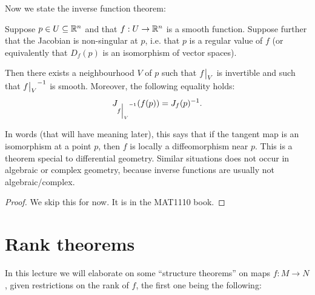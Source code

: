 \documentclass[11pt, english]{article}
\begin{document}
Now we state the inverse function theorem:
\begin{thm}
Suppose $p \in U \subseteq \mathbb{R}^n$ and that $f:U \to \mathbb{R}^n$ is a smooth function. Suppose further that the Jacobian is non-singular at $p$, i.e. that $p$ is a regular value of $f$ (or equivalently that $D_f(p)$ is an isomorphism of vector spaces).

Then there exists a neighbourhood $V$ of $p$ such that $\restr fV$ is invertible and such that $\restr fV^{-1}$ is smooth. Moreover, the following equality holds:
\[
J_{\restr fV^{-1}}(f(p)) = J_f(p)^{-1}.
\]
\end{thm}

In words (that will have meaning later), this says that if the tangent map is an isomorphism at a point $p$, then $f$ is locally a diffeomorphism near $p$. This is a theorem special to differential geometry. Similar situations does not occur in algebraic or complex geometry, because inverse functions are usually not algebraic/complex.


\begin{proof}
We skip this for now. It is in the MAT1110 book.
\end{proof}

\pagebreak
\section{Rank theorems}

In this lecture we will elaborate on some ``structure theorems'' on maps $f:M \to N$, given restrictions on the rank of $f$, the first one being the following:
\end{document}
